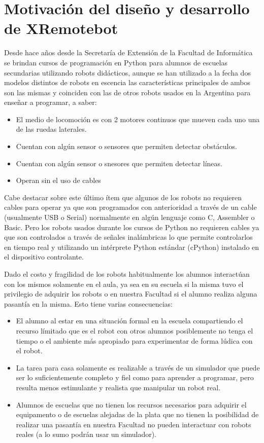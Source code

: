 \section{Motivación del diseño y desarrollo de XRemotebot}\label{ch1:motivacion}

Desde hace años desde la Secretaría de Extensión de la Facultad de Informática
se brindan cursos de programación en Python para alumnos de escuelas
secundarias utilizando robots didácticos, aunque se han utilizado a la fecha
dos modelos distintos de robots en escencia las características principales
de ambos son las mismas y coinciden con las de otros robots usados en la
Argentina para enseñar a programar, a saber:
\begin{itemize}
    \item El medio de locomoción es con 2 motores continuos que mueven cada
        uno una de las ruedas laterales.
    \item Cuentan con algún sensor o sensores que permiten detectar obstáculos.
    \item Cuentan con algún sensor o snesores que permiten detectar líneas.
    \item Operan sin el uso de cables
\end{itemize}

Cabe destacar sobre este último ítem que algunos de los robots no requieren
cables para operar ya que son programados con anterioridad a través de un
cable (usualmente USB o Serial) normalmente en algún lenguaje como C, Assembler
o Basic. Pero los robots usados durante los cursos
de Python no requieren cables ya que son controlados a través de señales
inalámbricas lo que permite controlarlos en tiempo real y utilizando
un intérprete Python estándar (cPython) instalado en el dispositivo
controlante.

Dado el costo y fragilidad de los robots habitualmente los alumnos interactúan
con los mismos solamente en el aula, ya sea en su escuela si la misma tuvo
el privilegio de adquirir los robots o en nuestra Facultad si el alumno
realiza alguna pasantía en la misma. Esto tiene varias consecuencias:
\begin{itemize}
    \item El alumno al estar en una situación formal en la escuela
        compartiendo el recurso límitado que es el robot con otros
        alumnos posiblemente no tenga el tiempo o el ambiente más apropiado
        para experimentar de forma lúdica con el robot.
    \item La tarea para casa solamente es realizable a través de un simulador
        que puede ser lo suficientemente completo y fiel como para aprender
        a programar, pero resulta menos estimulante y realista que manipular
        un robot real.
    \item Alumnos de escuelas que no tienen los recursos necesarios para
        adquirir el equipamento o de escuelas alejadas de la plata que
        no tienen la posibilidad de realizar una pasantía en nuestra
        Facultad no pueden interactuar con robots reales
        (a lo sumo podrán usar un simulador).
\end{itemize}


